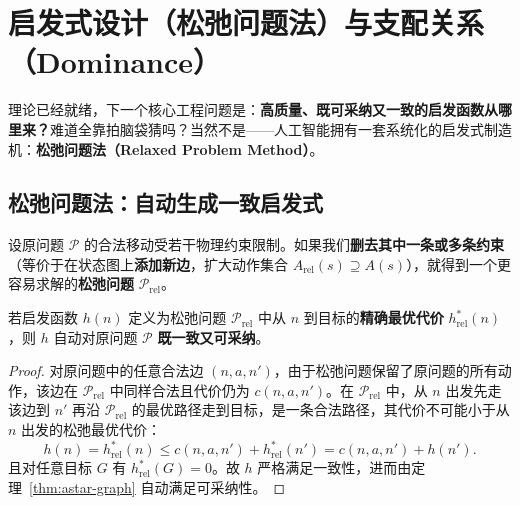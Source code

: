 \section{启发式设计（松弛问题法）与支配关系（Dominance）}\label{sec:heuristics}

理论已经就绪，下一个核心工程问题是：\textbf{高质量、既可采纳又一致的启发函数从哪里来？}难道全靠拍脑袋猜吗？当然不是——人工智能拥有一套系统化的启发式制造机：\textbf{松弛问题法（Relaxed Problem Method）}。

\subsection{松弛问题法：自动生成一致启发式}

设原问题 $\mathcal{P}$ 的合法移动受若干物理约束限制。如果我们\textbf{删去其中一条或多条约束}（等价于在状态图上\textbf{添加新边}，扩大动作集合 $A_{\text{rel}}(s) \supseteq A(s)$），就得到一个更容易求解的\textbf{松弛问题} $\mathcal{P}_{\text{rel}}$。

\begin{thmBox}
\begin{proposition}[松弛问题最优代价的天然一致性]\label{prop:relaxed-consistent}
若启发函数 $h(n)$ 定义为松弛问题 $\mathcal{P}_{\text{rel}}$ 中从 $n$ 到目标的\textbf{精确最优代价} $h^*_{\text{rel}}(n)$，则 $h$ 自动对原问题 $\mathcal{P}$ \textbf{既一致又可采纳}。
\end{proposition}
\end{thmBox}

\begin{proof}
对原问题中的任意合法边 $(n, a, n')$，由于松弛问题保留了原问题的所有动作，该边在 $\mathcal{P}_{\text{rel}}$ 中同样合法且代价仍为 $c(n,a,n')$。在 $\mathcal{P}_{\text{rel}}$ 中，从 $n$ 出发先走该边到 $n'$ 再沿 $\mathcal{P}_{\text{rel}}$ 的最优路径走到目标，是一条合法路径，其代价不可能小于从 $n$ 出发的松弛最优代价：
\[
  h(n) = h^*_{\text{rel}}(n) \le c(n,a,n') + h^*_{\text{rel}}(n') = c(n,a,n') + h(n').
\]
且对任意目标 $G$ 有 $h^*_{\text{rel}}(G)=0$。故 $h$ 严格满足一致性，进而由定理~\ref{thm:astar-graph} 自动满足可采纳性。
\end{proof}

